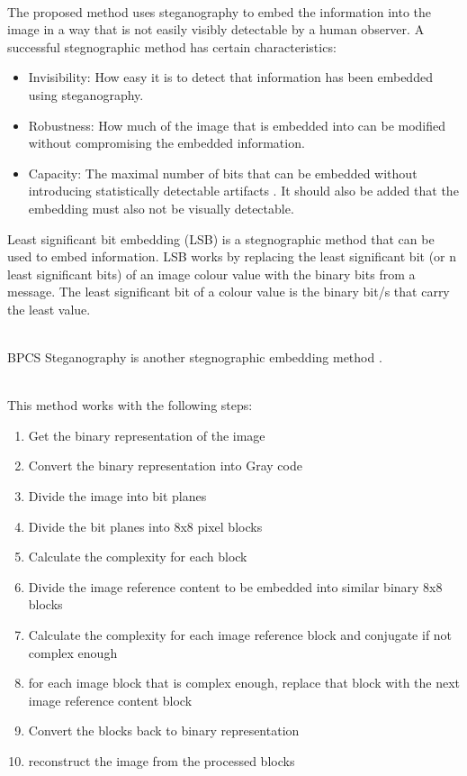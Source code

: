 \documentclass[12pt]{article}
\begin{document}
\hspace{0pt} \\
The proposed method uses steganography to embed the information into the image in a way that is not easily visibly detectable by a human observer.
A successful stegnographic method has certain characteristics:
\begin{itemize}
	\item Invisibility: How easy it is to detect that information has been embedded using steganography.
	\item Robustness: How much of the image that is embedded into can be modified without compromising the embedded information.
	\item Capacity: The maximal number of bits that can be embedded without introducing statistically detectable artifacts \cite{fridrich2009steganography}. It should also be added that the embedding must also not be visually detectable.
\end{itemize}
Least significant bit embedding (LSB) is a stegnographic method that can be used to embed information. 
LSB works by replacing the least significant bit (or n least significant bits) of an image colour value with the binary bits from a message. The least significant bit of a colour value is the binary bit/s that carry the least value.

\hspace{0pt} \\
BPCS Steganography is another stegnographic embedding method \cite{beaullieubpcs}.

\hspace{0pt} \\
This method works with the following steps:
\begin{enumerate}
  \item Get the binary representation of the image
  \item Convert the binary representation into Gray code
  \item Divide the image into bit planes
  \item Divide the bit planes into 8x8 pixel blocks
  \item Calculate the complexity for each block
  \item Divide the image reference content to be embedded into similar binary 8x8 blocks
  \item Calculate the complexity for each image reference block and conjugate if not complex enough
  \item for each image block that is complex enough, replace that block with the next image reference content block
  \item Convert the blocks back to binary representation
  \item reconstruct the image from the processed blocks 
\end{enumerate}
\end{document}
